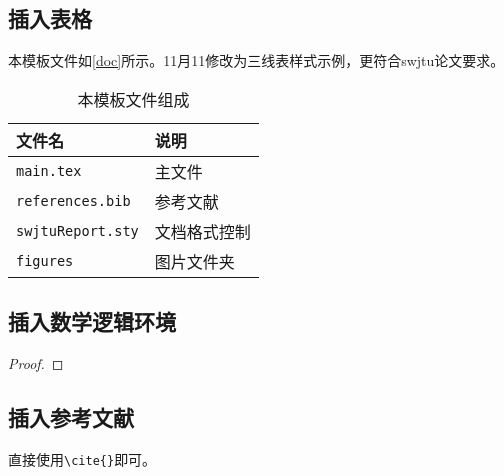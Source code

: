 \subsection{插入表格}
本模板文件如\autoref{doc}所示。11月11修改为三线表样式示例，更符合swjtu论文要求。
\begin{table}[!htbp]
    \centering %
    \renewcommand{\arraystretch}{1.5} %
    \begin{tabular}{>{\centering\arraybackslash}p{5cm} >{\centering\arraybackslash}p{5cm}} %
    \hline
        文件名 & 说明 \\
        \hline
        \texttt{main.tex}  & 主文件 \\
        \texttt{references.bib} & 参考文献 \\
        \texttt{swjtuReport.sty}  & 文档格式控制\\
        \texttt{figures}  & 图片文件夹 \\
        \hline
    \end{tabular}
    \caption{本模板文件组成}
    \label{doc}
\end{table}


\subsection{插入数学逻辑环境}
\begin{Theorem}   %
\end{Theorem}

\begin{Lemma}   %
\end{Lemma}

\begin{Corollary}   %
\end{Corollary}

\begin{Proposition}   %
\end{Proposition}

\begin{Definition}   %
\end{Definition}

\begin{Example}   %
\end{Example}

\begin{proof}   %
\end{proof}

\subsection{插入参考文献}
直接使用\verb|\cite{}|即可。

